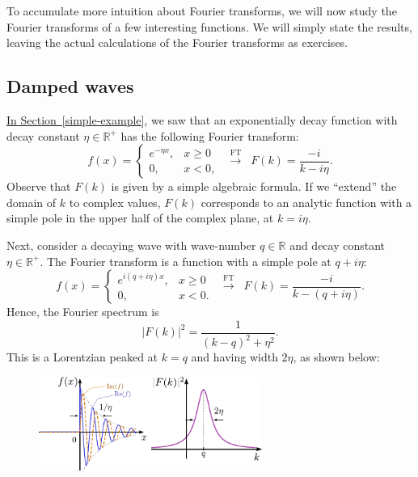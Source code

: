 \documentclass[10pt,a4paper]{article}
\begin{document}
To accumulate more intuition about Fourier transforms, we will now study
the Fourier transforms of a few interesting functions. We will simply
state the results, leaving the actual calculations of the Fourier
transforms as exercises.

\subsection{Damped waves}\label{damped-waves}

\hyperref[simple-example]{In Section~\ref{simple-example}}, we saw
that an exponentially decay function with decay constant $\eta \in
\mathbb{R}^+$ has the following Fourier transform:
\begin{equation}
  f(x) = \left\{\begin{array}{cl}e^{-\eta x}, & x \ge 0 \\ 0, & x < 0,\end{array}\right. \;\;  \overset{\mathrm{FT}}{\longrightarrow} \;\; F(k) = \frac{-i}{k-i\eta}.
\end{equation}
Observe that $F(k)$ is given by a simple algebraic formula. If we
``extend'' the domain of $k$ to complex values, $F(k)$ corresponds to
an analytic function with a simple pole in the upper half of the
complex plane, at $k = i\eta$.

Next, consider a decaying wave with wave-number $q \in \mathbb{R}$ and
decay constant $\eta \in \mathbb{R}^+$. The Fourier transform is a
function with a simple pole at $q + i \eta$:
\begin{equation}
f(x) = \left\{\begin{array}{cl}e^{i (q + i\eta) x}, & x \ge 0 \\ 0, & x < 0.\end{array}\right. \;\;  \overset{\mathrm{FT}}{\longrightarrow} \;\; F(k) = \frac{-i}{k-(q + i\eta)}.
\end{equation}
Hence, the Fourier spectrum is 
\begin{equation}
  |F(k)|^2 = \frac{1}{(k-q)^2 + \eta^2}.
\end{equation}
This is a Lorentzian peaked at $k = q$ and having width $2\eta$, as
shown below:

\begin{figure}[h]
  \centering\includegraphics[width=0.65\textwidth]{fourier_example2}
\end{figure}
\end{document}

